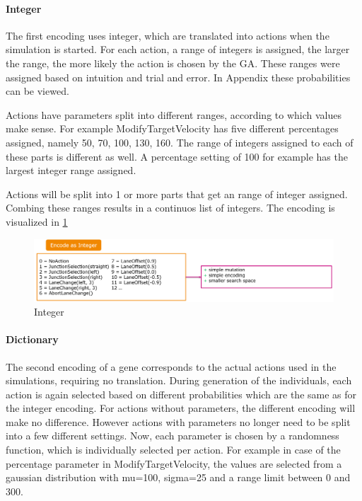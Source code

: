 \paragraph{Integer}
The first encoding uses integer, which are translated into actions when the simulation is started. For each action, a range of integers is assigned, the larger the range, the more likely the action is chosen by the GA. These ranges were assigned based on intuition and trial and error. In Appendix  these probabilities can be viewed.

Actions have parameters split into different ranges, according to which values make sense. For example ModifyTargetVelocity has five different percentages assigned, namely 50, 70, 100, 130, 160. The range of integers assigned to each of these parts is different as well. A percentage setting of 100 for example has the largest integer range assigned.

Actions will be split into 1 or more parts that get an range of integer assigned. Combing these ranges results in a continuos list of integers.
The encoding is visualized in \ref{figure:encoding:gene:int}

\begin{figure}[ht] 
	\includegraphics[width=1\linewidth]{figures/int_encoding}
	\caption{Integer}
	\label{figure:encoding:gene:int}
\end{figure}

\paragraph{Dictionary}
The second encoding of a gene corresponds to the actual actions used in the simulations, requiring no translation. During generation of the individuals, each action is again selected based on different probabilities which are the same as for the integer encoding. For actions without parameters, the different encoding will make no difference. However actions with parameters no longer need to be split into a few different settings. Now, each parameter is chosen by a randomness function, which is individually selected per action. For example in case of the percentage parameter in ModifyTargetVelocity, the values are selected from a gaussian distribution with mu=100, sigma=25 and a range limit between 0 and 300.

